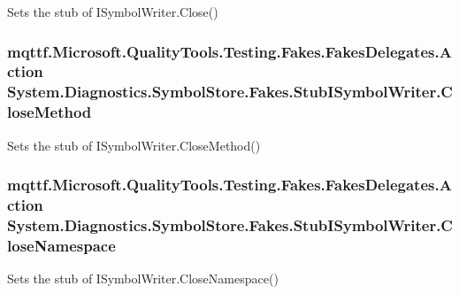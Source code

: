 Sets the stub of I\-Symbol\-Writer.\-Close()

\hypertarget{class_system_1_1_diagnostics_1_1_symbol_store_1_1_fakes_1_1_stub_i_symbol_writer_a13ef201625f316f09a8e5c2f93541c75}{
\subsubsection[{Close\-Method}]{\setlength{\rightskip}{0pt plus 5cm}mqttf.\-Microsoft.\-Quality\-Tools.\-Testing.\-Fakes.\-Fakes\-Delegates.\-Action System.\-Diagnostics.\-Symbol\-Store.\-Fakes.\-Stub\-I\-Symbol\-Writer.\-Close\-Method}}\label{class_system_1_1_diagnostics_1_1_symbol_store_1_1_fakes_1_1_stub_i_symbol_writer_a13ef201625f316f09a8e5c2f93541c75}


Sets the stub of I\-Symbol\-Writer.\-Close\-Method()

\hypertarget{class_system_1_1_diagnostics_1_1_symbol_store_1_1_fakes_1_1_stub_i_symbol_writer_aec74b3dec29a66cf1c1611c1d6c8493f}{
\subsubsection[{Close\-Namespace}]{\setlength{\rightskip}{0pt plus 5cm}mqttf.\-Microsoft.\-Quality\-Tools.\-Testing.\-Fakes.\-Fakes\-Delegates.\-Action System.\-Diagnostics.\-Symbol\-Store.\-Fakes.\-Stub\-I\-Symbol\-Writer.\-Close\-Namespace}}\label{class_system_1_1_diagnostics_1_1_symbol_store_1_1_fakes_1_1_stub_i_symbol_writer_aec74b3dec29a66cf1c1611c1d6c8493f}


Sets the stub of I\-Symbol\-Writer.\-Close\-Namespace()


